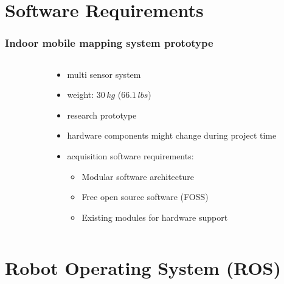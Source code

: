 \documentclass[aspectratio=169]{beamer}
\begin{document}
\begin{frame}
\begin{columns}[onlytextwidth]
\begin{column}{0.5\textwidth}
\begin{center}
    \end{center}
    
    \end{column}
    
   \end{columns}
  \end{frame}


\section{Software Requirements}

  \begin{frame}
   \frametitle{Indoor mobile mapping system prototype}
   \begin{columns}[onlytextwidth]
    \begin{column}{0.5\textwidth}
      \def\svgwidth{5.5cm}
      
    \end{column}
    \begin{column}{0.5\textwidth}
      \begin{itemize}
        \item multi sensor system
	\item weight: $30\,kg$ ($66.1\, lbs$)
	\item research prototype
	\item hardware components might change during project time
       \pause
       \item acquisition software requirements:
       \begin{itemize}
       \item Modular software architecture
       \item Free open source software (FOSS)
       \item Existing modules for hardware support
       \end{itemize}
      \end{itemize}
    \end{column}

   \end{columns}
  \end{frame}

\section{Robot Operating System (ROS)}
\end{document}

